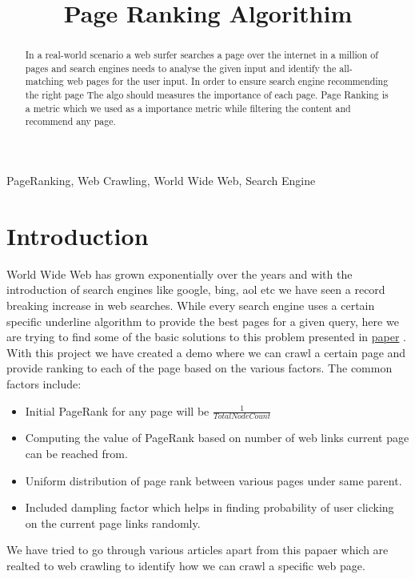 \documentclass{article}
\title{Page Ranking Algorithim}
\begin{document}
%
\maketitle
%
\begin{abstract}
    In a real-world scenario a web surfer searches a page over the internet in a million of pages and search engines needs to analyse the given input and identify the all-matching web pages for the user input. 
    In order to ensure search engine recommending the right page The algo should measures the importance of each page. 
    Page Ranking is a metric which we used as a importance metric while filtering the content and recommend any page. \vspace{2cm}
\end{abstract}
%
\begin{keywords}
PageRanking, Web Crawling, World Wide Web, Search Engine
\end{keywords}
%

\section{Introduction}
\label{sec:intro}
World Wide Web has grown exponentially over the years and with the introduction of search engines like google, bing, aol etc we have seen a record breaking increase in web searches. While every search engine uses a certain specific underline algorithm to provide the best pages for a given query, here we are trying to find some of the basic solutions to this problem presented in \href{http://ilpubs.stanford.edu:8090/422/1/1999-66.pdf}{paper} . With this project we have created a demo where we can crawl a certain page and provide ranking to each of the page based on the various factors. The common factors include:
\begin{itemize}
    \item Initial PageRank for any page will be $\frac{1}{Total Node Count}$
    \item Computing the value of PageRank based on number of web links current page can be reached from.
    \item Uniform distribution of page rank between various pages under same parent.
    \item Included dampling factor which helps in finding probability of user clicking on the current page links randomly.
\end{itemize}

We have tried to go through various articles apart from this papaer which are realted to web crawling to identify how we can crawl a specific web page.
\end{document}
